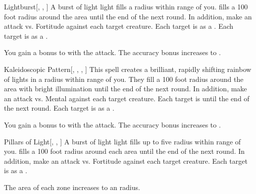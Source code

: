 \lowercase{\hypertarget{spell:Lightburst}{}}\label{spell:Lightburst}
\begin{freeability}[Rank 3]{\hypertarget{spell:Lightburst}{Lightburst}}[, , ]
A burst of light light fills a \areasmall radius  within \rngmed range of you.
 fills a 100 foot radius around the area until the end of the next round.
In addition, make an attack vs. Fortitude against each target creature.
\hit Each target is \dazzled as a .
\crit Each target is  as a .

\rankline
{} You gain a  bonus to  with the attack.
 The accuracy bonus increases to .
\end{freeability}
\vspace{0.25em}



\lowercase{\hypertarget{spell:Kaleidoscopic Pattern}{}}\label{spell:Kaleidoscopic Pattern}
\begin{freeability}[Rank 4]{\hypertarget{spell:Kaleidoscopic Pattern}{Kaleidoscopic Pattern}}[, , , ]
This spell creates a brilliant, rapidly shifting rainbow of lights in a \areamed radius within \rngmed range of you.
They fill a 100 foot radius around the area with bright illumination until the end of the next round.
In addition, make an attack vs. Mental against each target creature.
\hit Each target is  until the end of the next round.
\crit Each target is  as a .

\rankline
{} You gain a  bonus to  with the attack.
 The accuracy bonus increases to .
\end{freeability}
\vspace{0.25em}



\lowercase{\hypertarget{spell:Pillars of Light}{}}\label{spell:Pillars of Light}
\begin{freeability}[Rank 5]{\hypertarget{spell:Pillars of Light}{Pillars of Light}}[, , ]
A burst of light light fills up to five \areasmall radius  within \rnglong range of you.
 fills a 100 foot radius around each area until the end of the next round.
In addition, make an attack vs. Fortitude against each target creature.
\hit Each target is \dazzled as a .

\rankline
{} The area of each zone increases to an  radius.
\end{freeability}
\vspace{0.25em}



